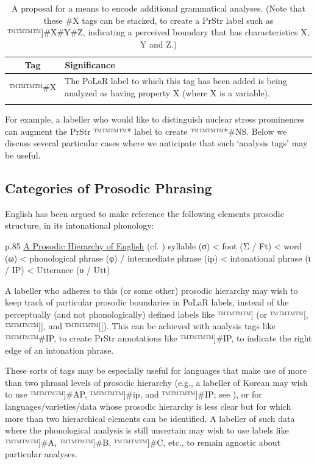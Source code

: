\documentclass[11pt, twoside]{memoir}
\begin{document}
\begin{longtable}{cp{.8\linewidth}} \toprule \textbf{Tag} & \textbf{Significance} \tabularnewline
\midrule \endhead
™™™™{\#X} & The PoLaR label to which this tag has been added is being analyzed as having property X (where X is a variable). \tabularnewline
\bottomrule
\caption[A proposal for a means to encode additional grammatical analyses.]{A proposal for a means to encode additional grammatical analyses. (Note that these \#X tags can be stacked, to create a PrStr label such as ™™™™{]\#X\#Y\#Z}, indicating a perceived boundary that has characteristics X, Y and Z.)}
\end{longtable}

For example, a labeller who would like to distinguish nuclear stress prominences can augment the PrStr ™™™™{*} label to create ™™™™{*\#NS}. Below we discuss several particular cases where we anticipate that such ‘analysis tags’ may be useful.

\subsection{Categories of Prosodic Phrasing}\label{sec:categories-of-prosodic-phrasing}

English has been argued to make reference the following elements prosodic structure, in its intonational phonology:

\begin{longtable*}{p{.85\linewidth}}
\uline{A Prosodic Hierarchy of English} (cf. \citealt{nesporvogel86, shattuck-hufnagel-96, fery17}) \newline
syllable (σ) < foot (Σ / Ft) < word (ω) < phonological phrase (φ) / intermediate phrase (ip) < intonational phrase (ι / IP) < Utterance (υ / Utt) \\
\end{longtable*}

A labeller who adheres to this (or some other) prosodic hierarchy may wish to keep track of particular prosodic boundaries in PoLaR labels, instead of the perceptually (and not phonologically) defined labels like ™™™™{]} (or ™™™™{[}, ™™™™{]]}, and ™™™™{[[}). This can be achieved with analysis tags like ™™™™{\#IP}, to create PrStr annotations like ™™™™{]\#IP}, to indicate the right edge of an intonation phrase.

These sorts of tags may be especially useful for languages that make use of more than two phrasal levels of prosodic hierarchy (e.g., a labeller of Korean may wish to use ™™™™{]\#AP}, ™™™™{]\#ip}, and ™™™™{]\#IP}; see \citealt{jun07}), or for languages\slash varieties\slash data whose prosodic hierarchy is less clear but for which more than two hierarchical elements can be identified. A labeller of such data where the phonological analysis is still uncertain may wish to use labels like ™™™™{]\#A}, ™™™™{]\#B}, ™™™™{]\#C}, etc., to remain agnostic about particular analyses.
\end{document}
